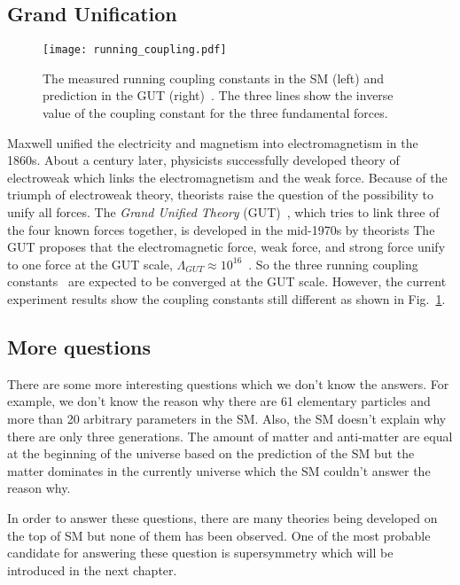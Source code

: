 
\subsection{Grand Unification}
\label{subsec:sm_grand_unification}

\begin{figure}[tbp]
    \begin{center}
        \texttt{[image: running\_coupling.pdf]}
        \caption{The measured running coupling constants in the SM (left) and prediction in the GUT (right)~\cite{Ur0ol}.
        The three lines show the inverse value of the coupling constant for the three fundamental forces.}
        \label{fig:sm_coulping_constants}
    \end{center}
\end{figure}

Maxwell unified the electricity and magnetism into electromagnetism in the 1860s.
About a century later, physicists successfully developed theory of electroweak which links the electromagnetism and the weak force.
Because of the triumph of electroweak theory, theorists raise the question of the possibility to unify all forces.
The \textit{Grand Unified Theory} (GUT)~\cite{Ross:1985ai}, which tries to link three of the four known forces together, is developed in the mid-1970s by theorists
The GUT proposes that the electromagnetic force, weak force, and strong force unify to one force at the GUT scale, $\Lambda_{GUT} \approx 10^{16}$~{\GeV}.
So the three running coupling constants~\cite{Mohr:2015ccw} are expected to be converged at the GUT scale.
However, the current experiment results show the coupling constants still different as shown in Fig.~\ref{fig:sm_coulping_constants}.


\subsection{More questions}
\label{subsec:sm_more_questions}
There are some more interesting questions which we don't know the answers.
For example, we don't know the reason why there are 61 elementary particles and more than 20 arbitrary parameters in the SM.
Also, the SM doesn't explain why there are only three generations.
The amount of matter and anti-matter are equal at the beginning of the universe based on the prediction of the SM but the matter dominates in the currently universe which the SM couldn't answer the reason why.

In order to answer these questions, there are many theories being developed on the top of SM but none of them has been observed.
One of the most probable candidate for answering these question is supersymmetry which will be introduced in the next chapter.
